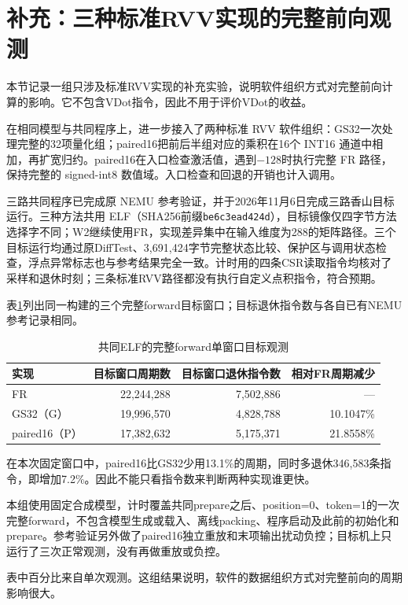 \section{补充：三种标准RVV实现的完整前向观测}
本节记录一组只涉及标准RVV实现的补充实验，说明软件组织方式对完整前向计算的影响。它不包含VDot指令，因此不用于评价VDot的收益。

在相同模型与共同程序上，进一步接入了两种标准 RVV 软件组织：GS32一次处理完整的32项量化组；paired16把前后半组对应的乘积在16个 INT16 通道中相加，再扩宽归约。paired16在入口检查激活值，遇到$-128$时执行完整 FR 路径，保持完整的 signed-int8 数值域。入口检查和回退的开销也计入调用。

三路共同程序已完成原 NEMU 参考验证，并于2026年11月6日完成三路香山目标运行。三种方法共用 ELF（SHA256前缀\texttt{be6c3ead424d}），目标镜像仅四字节方法选择字不同；W2继续使用FR，实现差异集中在输入维度为288的矩阵路径。三个目标运行均通过原DiffTest、3,691,424字节完整状态比较、保护区与调用状态检查，浮点异常标志也与参考结果完全一致。计时用的四条CSR读取指令均核对了采样和退休时刻；三条标准RVV路径都没有执行自定义点积指令，符合预期。

表\ref{tab:3-app-reference}列出同一构建的三个完整forward目标窗口；目标退休指令数与各自已有NEMU参考记录相同。

\begin{table}[!htbp]\centering
\small\setlength{\tabcolsep}{4pt}
\caption{共同ELF的完整forward单窗口目标观测}\label{tab:3-app-reference}
\begin{tabular}{lrrr}
\toprule
实现 & 目标窗口周期数 & 目标窗口退休指令数 & 相对FR周期减少\\
\midrule
FR & 22,244,288 & 7,502,886 & ---\\
GS32（G） & 19,996,570 & 4,828,788 & 10.1047\%\\
paired16（P） & 17,382,632 & 5,175,371 & 21.8558\%\\
\bottomrule
\end{tabular}
\end{table}

在本次固定窗口中，paired16比GS32少用13.1\%的周期，同时多退休346,583条指令，即增加7.2\%。因此不能只看指令数来判断两种实现谁更快。

本组使用固定合成模型，计时覆盖共同prepare之后、position=0、token=1的一次完整forward，不包含模型生成或载入、离线packing、程序启动及此前的初始化和prepare。参考验证另外做了paired16独立重放和末项输出扰动负控；目标机上只运行了三次正常观测，没有再做重放或负控。

表中百分比来自单次观测。这组结果说明，软件的数据组织方式对完整前向的周期影响很大。

